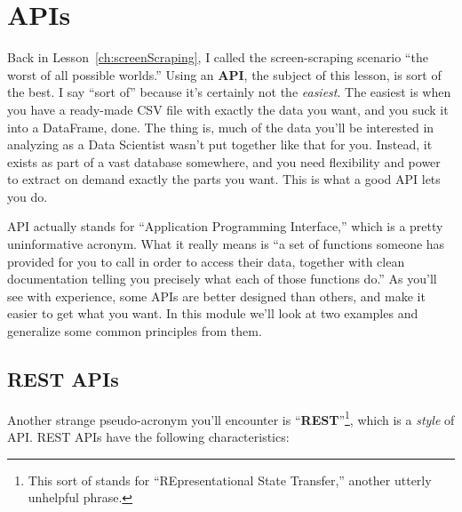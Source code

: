 
\chapter{APIs}

Back in Lesson~\ref{ch:screenScraping}, I called the screen-scraping scenario
``the worst of all possible worlds.'' Using an \textbf{API}, the subject of
this lesson, is sort of the best. I say ``sort of'' because it's certainly not
the \textit{easiest}. The easiest is when you have a ready-made CSV file with
exactly the data you want, and you suck it into a DataFrame, done. The thing
is, much of the data you'll be interested in analyzing as a Data Scientist
wasn't put together like that for you. Instead, it exists as part of a vast
database somewhere, and you need flexibility and power to extract on demand
exactly the parts you want. This is what a good API lets you do.

API actually stands for ``Application Programming Interface,'' which is a
pretty uninformative acronym. What it really means is ``a set of functions
someone has provided for you to call in order to access their data, together
with clean documentation telling you precisely what each of those functions
do.'' As you'll see with experience, some APIs are better designed than others,
and make it easier to get what you want. In this module we'll look at two
examples and generalize some common principles from them.

\section{REST APIs}

Another strange pseudo-acronym you'll encounter is
``\textbf{REST}''\footnote{This sort of stands for ``REpresentational State
Transfer,'' another utterly unhelpful phrase.}, which is a \textit{style} of
API. REST APIs have the following characteristics:

